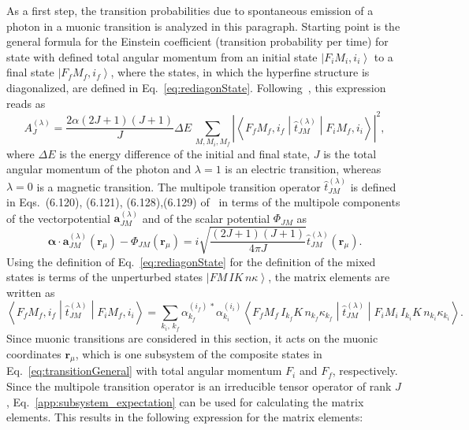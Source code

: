 As a first step, the transition probabilities due to spontaneous emission of a photon in a muonic transition is analyzed in this paragraph. Starting point is the general formula for the Einstein coefficient (transition probability per time) for state with defined total angular momentum from an initial state $\left|F_iM_i,i_i\right>$ to a final state $\left|F_fM_f,i_f\right>$, where the states, in which the hyperfine structure is diagonalized, are defined in Eq.~\eqref{eq:rediagonState}. Following~\cite[Section 6.]{johnson2007}, this expression reads as
\begin{equation}
\label{eq:transitionGeneral}
A^{(\lambda)}_{J}=\frac{2\alpha (2J+1)(J+1)}{J}\Delta E\,\sum_{M,M_i,M_f} \left|\left<F_fM_f,i_f\middle|\hat{t}^{(\lambda)}_{JM}\middle|F_iM_f,i_i\right>\right|^2,
\end{equation}
where $\Delta E$ is the energy difference of the initial and final state, $J$ is the total angular momentum of the photon and $\lambda=1$ is an electric transition, whereas $\lambda=0$ is a magnetic transition. The multipole transition operator $\hat{t}^{(\lambda)}_{JM}$ is defined in Eqs.~(6.120), (6.121), (6.128),(6.129) of~\cite{johnson2007} in terms of the multipole components of the vectorpotential $\mathbf{a}^{(\lambda)}_{JM}$ and of the scalar potential $\Phi_{JM}$ as
\begin{equation}
\boldsymbol{\alpha}\cdot \mathbf{a}^{(\lambda)}_{JM}(\mathbf{r}_\mu) - \Phi_{JM}(\mathbf{r}_\mu) = i\sqrt{\frac{(2J+1)(J+1)}{4\pi J}}\hat{t}^{(\lambda)}_{JM}(\mathbf{r}_\mu).
\end{equation}
Using the definition of Eq.~\eqref{eq:rediagonState} for the definition of the mixed states is terms of the unperturbed states $\left| FM\,IK\,n\kappa\right>$, the matrix elements are written as
\begin{equation}
\label{eq:tranElement1}
\left<F_fM_f,i_f\middle|\hat{t}^{(\lambda)}_{JM}\middle|F_iM_f,i_i\right> =
\sum_{k_i,\,k_f}\alpha^{(i_f)\,*}_{k_f} \alpha^{(i_i)}_{k_i}\left<F_fM_f\,I_{k_f}K\,n_{k_f}\kappa_{k_f} \middle|\hat{t}^{(\lambda)}_{JM}\middle|F_iM_i\,I_{k_i}K\,n_{k_i}\kappa_{k_i}\right>.
\end{equation}
Since muonic transitions are considered in this section, it acts on the muonic coordinates $\mathbf{r}_\mu$, which is one subsystem of the composite states in Eq.~\eqref{eq:transitionGeneral} with total angular momentum $F_i$ and $F_f$, respectively. Since the multipole transition operator is an irreducible tensor operator of rank $J$, Eq.~\eqref{app:subsystem_expectation} can be used for calculating the matrix elements. This results in the following expression for the matrix elements:
